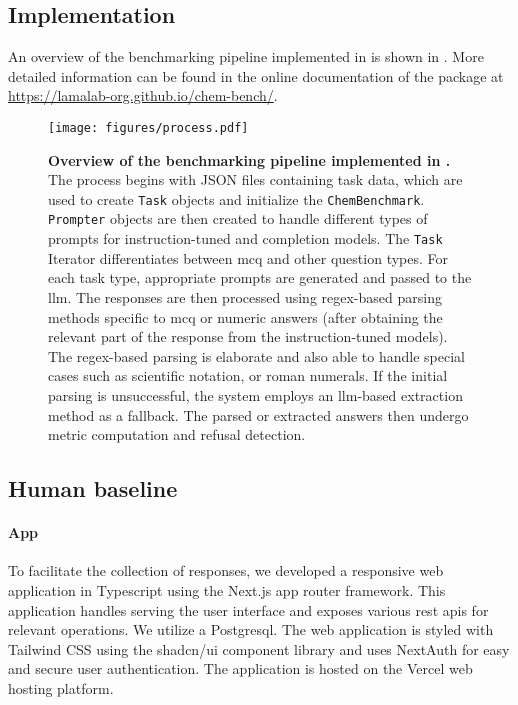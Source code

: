 \subsection{Implementation}
An overview of the benchmarking pipeline implemented in \chembench is shown in . More detailed information can be found in the online documentation of the \chembench package at \url{https://lamalab-org.github.io/chem-bench/}.
\begin{figure}
    \centering
    \texttt{[image: figures/process.pdf]}
    \caption{\textbf{Overview of the benchmarking pipeline implemented in \chembench.} The process begins with JSON files containing task data, which are used to create \texttt{Task} objects and initialize the \texttt{ChemBenchmark}. \texttt{Prompter} objects are then created to handle different types of prompts for instruction-tuned and completion models.
    The \texttt{Task} Iterator differentiates between \gls{mcq} and other question types. For each task type, appropriate prompts are generated and passed to the \gls{llm}. The responses are then processed using regex-based parsing methods specific to \gls{mcq} or numeric answers (after obtaining the relevant part of the response from the instruction-tuned models).
    The regex-based parsing is elaborate and also able to handle special cases such as scientific notation, or roman numerals.
    If the initial parsing is unsuccessful, the system employs an \gls{llm}-based extraction method as a fallback. The parsed or extracted answers then undergo metric computation and refusal detection.}
    \label{fig:process}
\end{figure}



\clearpage
\subsection{Human baseline} \label{sec:human_baseline}
\paragraph{App} To facilitate the collection of responses, we developed a responsive web application in Typescript using the Next.js\autocite{nextjs} app router framework.
This application handles serving the user interface and exposes various \gls{rest} \glspl{api} for relevant operations.
We utilize a Postgresql.
The web application is styled with Tailwind CSS\autocite{tailwindcss} using the shadcn/ui component library and uses NextAuth\autocite{nextauth} for easy and secure user authentication.
The application is hosted on the Vercel web hosting platform.

